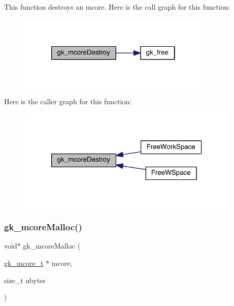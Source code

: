 This function destroys an mcore. Here is the call graph for this function\+:\nopagebreak
\begin{figure}[H]
\begin{center}
\leavevmode
\includegraphics[width=262pt]{a00077_acecd8b70b01b2b365695f034967c9536_cgraph}
\end{center}
\end{figure}
Here is the caller graph for this function\+:\nopagebreak
\begin{figure}[H]
\begin{center}
\leavevmode
\includegraphics[width=302pt]{a00077_acecd8b70b01b2b365695f034967c9536_icgraph}
\end{center}
\end{figure}
\mbox{\label{a00077_ab7a380f0696a0d5421653fad336bcae0}} 
\subsubsection{\texorpdfstring{gk\+\_\+mcore\+Malloc()}{gk\_mcoreMalloc()}}
{\footnotesize\ttfamily void$\ast$ gk\+\_\+mcore\+Malloc (\begin{DoxyParamCaption}\item[{\hyperlink{a00682}{gk\+\_\+mcore\+\_\+t} $\ast$}]{mcore,  }\item[{size\+\_\+t}]{nbytes }\end{DoxyParamCaption})}

